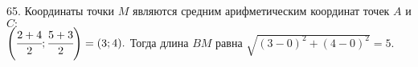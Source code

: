 65. Координаты точки $M$ являются средним арифметическим координат точек $A$ и $C:$\\$ \left(\cfrac{2+4}{2}; \cfrac{5+3}{2}\right)=(3;4).$ Тогда длина $BM$ равна $\sqrt{(3-0)^2+(4-0)^2}=5.$\\
